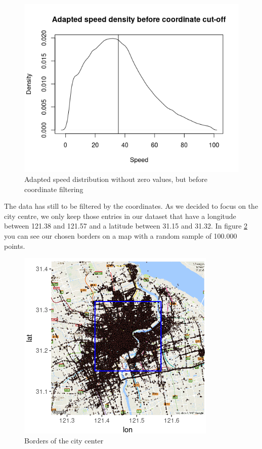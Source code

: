 \documentclass[11pt,conference,a4paper,twocolumns,romanappendices]{IEEEtran}
\begin{document}
\begin{figure}[h]
\centering
\includegraphics[scale=0.6]{density_before.png}
\caption{\label{fig:speed_before}Adapted speed distribution without zero values, but before coordinate filtering}
\end{figure}

The data has still to be filtered by the coordinates. As we decided to focus on the city centre, we only keep those entries in our dataset that have a longitude between 121.38 and 121.57 and a latitude between 31.15 and 31.32. In figure \ref{fig:borders} you can see our chosen borders on a map with a random sample of 100.000 points. \\

\begin{figure}[h]
\centering
\includegraphics[scale=0.9]{borders.png}
\caption{\label{fig:borders}Borders of the city center}
\end{figure}
\end{document}
